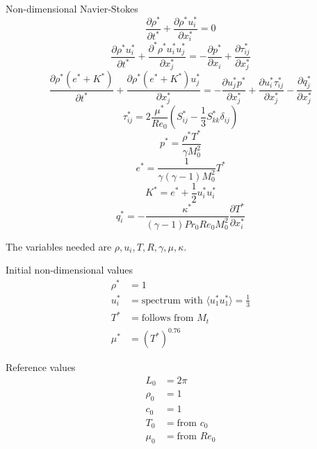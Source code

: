 \documentclass[oneside,a4paper,11pt]{report}
\begin{document}
Non-dimensional Navier-Stokes
\begin{equation}
\frac{\partial \rho^*}{\partial t^*} + \frac{\partial \rho^* u^*_i}{\partial x^*_i} = 0
\end{equation}
\begin{equation}
\frac{\partial \rho^* u^*_i}{\partial t^*} + \frac{\partial^* \rho^* u^*_i u^*_j}{\partial x^*_j} = -\frac{\partial p^*}{\partial x_i} + \frac{\partial \tau^*_{ij}}{\partial x^*_j}
\end{equation}
\begin{equation}
\frac{\partial \rho^* (e^* + K^*)}{\partial t^*} + \frac{\partial \rho^* (e^* + K^*) u^*_j}{\partial x^*_j} = -\frac{\partial u^*_j p^*}{\partial x^*_j} + \frac{\partial u^*_i \tau^*_{ij}}{\partial x^*_j} - \frac{\partial q^*_j}{\partial x^*_j}
\end{equation}
\begin{equation}
\tau^*_{ij} = 2 \frac{\mu^*}{Re_0} \left (S^*_{ij} - \frac{1}{3} S^*_{kk} \delta_{ij} \right )
\end{equation}
\begin{equation}
p^* = \frac{\rho^* T^*}{\gamma M_0^2}
\end{equation}
\begin{equation}
e^* = \frac{1}{\gamma (\gamma - 1) M_0^2} T^*
\end{equation}
\begin{equation}
K^* = e^* + \frac{1}{2} u_i^* u_i^*
\end{equation}
\begin{equation}
q_i^* = - \frac{\kappa^*}{(\gamma - 1) Pr_0 Re_0 M_0^2} \frac{ \partial T^*}{\partial x_i^*}
\end{equation}

\newpage
The variables needed are $\rho, u_i, T, R, \gamma, \mu, \kappa$.

Initial non-dimensional values
\begin{align}
\rho^* &= 1 \nonumber \\
u_i^* &= \text{spectrum with } \langle u^*_1 u^*_1 \rangle = \frac{1}{3} \nonumber \\
T^* &= \text{follows from }M_t \nonumber \\
\mu^* &= \left ( T^* \right)^{0.76}
\end{align}

Reference values
\begin{align}
L_0 &= 2 \pi \nonumber \\
\rho_0 &= 1 \nonumber \\
c_0 &= 1 \nonumber \\
T_0 &= \text{from }c_0 \nonumber \\
\mu_0 &= \text{from } Re_0
\end{align}
\end{document}
